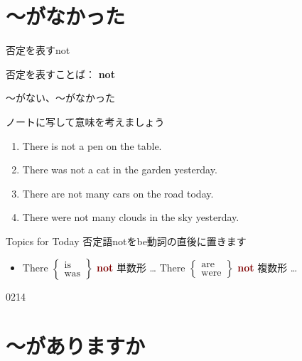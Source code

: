 \documentclass[aspectratio=169,xcolor={dvipsnames,table}]{beamer}
\newcommand{\myaudio}[1]{\href{#1}{\faVolumeUp}}
\begin{document}
\section{～がなかった}
\begin{frame}[plain]{否定を表すnot}
 \Large

否定を表すことば： {\LARGE\bfseries not}\hspace{20pt}
\end{frame}
\begin{frame}[plain]{〜がない、～がなかった}

ノートに写して意味を考えましょう

\begin{enumerate}
 \item There is not a pen on the table.
 \item There was not a cat in the garden yesterday.
 \item There are not many cars on the road today.
 \item There were not many clouds in the sky yesterday.
\end{enumerate}

\begin{block}{Topics for Today}
否定語notをbe動詞の直後に置きます
\begin{itemize}[square]
 \item There $\left\{\begin{array}{l}\text{is}\\\text{was}\end{array}
\right\}$ \textcolor{Maroon}{\bfseries not} 単数形 \ldots\hspace{40pt}
There $\left\{\begin{array}{l}\text{are}\\\text{were}\end{array}
\right\}$ \textcolor{Maroon}{\bfseries not} 複数形 \ldots
\end{itemize}
\end{block}

\hfill{\tiny 0214}\,{\scriptsize \myaudio{./audio/001_there_is_05.mp3}}
\end{frame}
\section{～がありますか}
\end{document}
